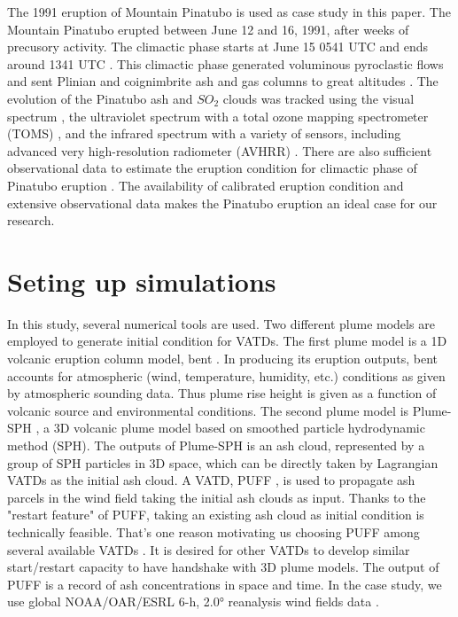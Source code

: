 The 1991 eruption of Mountain Pinatubo is used as case study in this paper. The Mountain Pinatubo erupted between June 12 and 16, 1991, after weeks of precusory activity. The climactic phase starts at June 15 0541 UTC and ends around 1341 UTC \citep{holasek1996satellite}. This climactic phase generated voluminous pyroclastic flows and sent Plinian and coignimbrite ash and gas columns to great altitudes \citep{scott1996pyroclastic}. The evolution of the Pinatubo ash and $SO_2$ clouds was tracked using the visual spectrum \citep{holasek1996satellite}, the ultraviolet spectrum with a total ozone mapping spectrometer (TOMS) \citep{guo2004re}, and the infrared spectrum with a variety of sensors, including advanced very high-resolution radiometer (AVHRR) \citep{guo2004particles}. There are also sufficient observational data to estimate the eruption condition for climactic phase of Pinatubo eruption \citep{suzuki2009three}. The availability of calibrated eruption condition and extensive observational data makes the Pinatubo eruption an ideal case for our research. 

\section{Seting up simulations} \label{sec:Methodology}

In this study, several numerical tools are used. Two different plume models are employed to generate initial condition for VATDs.
The first plume model is a 1D volcanic eruption column model, bent \citep{bursik2001effect}. In producing its eruption outputs, bent accounts for atmospheric (wind, temperature, humidity, etc.) conditions as given by atmospheric sounding data. Thus plume rise height is given as a function of volcanic source and environmental conditions. The second plume model is Plume-SPH \citep{gmd-2017-119}, a 3D volcanic plume model based on smoothed particle hydrodynamic method (SPH). The outputs of Plume-SPH is an ash cloud, represented by a group of SPH particles in 3D space, which can be directly taken by Lagrangian VATDs as the initial ash cloud. A VATD, PUFF \citep{tanaka1991development,searcy1998puff}, is used to propagate ash parcels in the wind field taking the initial ash clouds as input. Thanks to the "restart feature" of PUFF, taking an existing ash cloud as initial condition is technically feasible. That's one reason motivating us choosing PUFF among several available VATDs \citep[e.g.][]{searcy1998puff,schwaiger2012ash3d}. It is desired for other VATDs to develop similar start/restart capacity to have handshake with 3D plume models. The output of PUFF is a record of ash concentrations in space and time. In the case study, we use global NOAA/OAR/ESRL 6-h, 2.0° reanalysis wind fields data \citep{whitaker2004reanalysis, compo2006feasibility, compo2011twentieth}.

